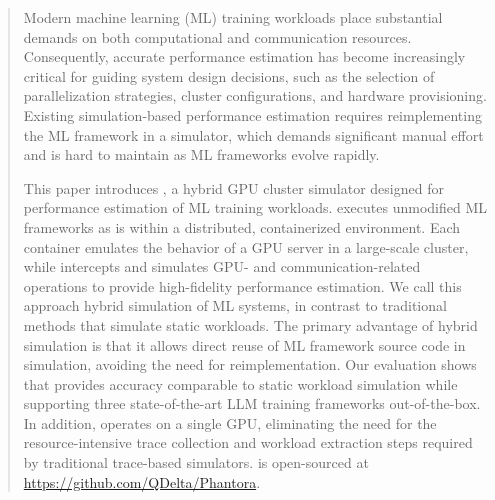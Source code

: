\begin{abstract}
Modern machine learning (ML) training workloads place substantial demands on both computational and communication resources. Consequently, accurate performance estimation has become increasingly critical for guiding system design decisions, such as the selection of parallelization strategies, cluster configurations, and hardware provisioning. Existing simulation-based performance estimation requires reimplementing the ML framework in a simulator, which demands significant manual effort and is hard to maintain as ML frameworks evolve rapidly.

This paper introduces \sys, a hybrid GPU cluster simulator designed for performance estimation of ML training workloads. \sys executes unmodified ML frameworks as is within a distributed, containerized environment. Each container emulates the behavior of a GPU server in a large-scale cluster, while \sys intercepts and simulates GPU- and communication-related operations to provide high-fidelity performance estimation. We call this approach hybrid simulation of ML systems, in contrast to traditional methods that simulate static workloads. The primary advantage of hybrid simulation is that it allows direct reuse of ML framework source code in simulation, avoiding the need for reimplementation. Our evaluation shows that \sys provides accuracy comparable to static workload simulation while supporting three state-of-the-art LLM training frameworks out-of-the-box. In addition, \sys operates on a single GPU, eliminating the need for the resource-intensive trace collection and workload extraction steps required by traditional trace-based simulators.
\sys is open-sourced at \url{https://github.com/QDelta/Phantora}. 

\end{abstract}